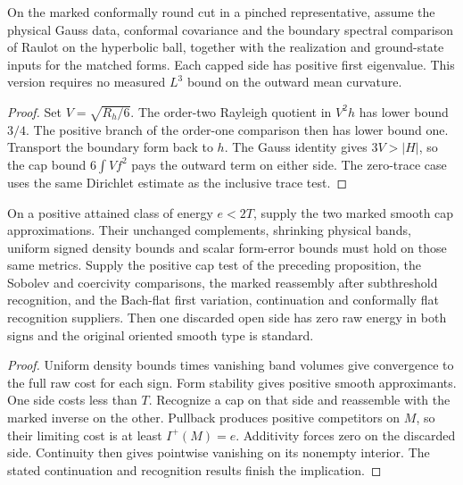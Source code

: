 \begin{proposition}
\label{prop:ed52-weighted-robin}
\leanok
On the marked conformally round cut in a pinched representative, assume
the physical Gauss data, conformal covariance and the boundary spectral
comparison of Raulot on the hyperbolic ball, together with the
realization and ground-state inputs for the matched forms. Each capped
side has positive first eigenvalue. This version requires no measured
$L^3$ bound on the outward mean curvature.
\end{proposition}
\begin{proof}
\leanok
Set $V=\sqrt{R_h/6}$. The order-two Rayleigh quotient in $V^2h$ has
lower bound $3/4$. The positive branch of the order-one comparison
then has lower bound one. Transport the boundary form back to $h$.
The Gauss identity gives $3V>|H|$, so the cap bound
$6\int V f^2$ pays the outward term on either side. The zero-trace
case uses the same Dirichlet estimate as the inclusive trace test.
\end{proof}

\begin{proposition}
\label{prop:ed07-attained-cut}
\leanok
On a positive attained class of energy $e<2T$, supply the two marked
smooth cap approximations. Their unchanged complements, shrinking
physical bands, uniform signed density bounds and scalar form-error
bounds must hold on those same metrics. Supply the positive cap
test of the preceding proposition, the Sobolev and coercivity
comparisons, the marked reassembly after subthreshold recognition,
and the Bach-flat first variation, continuation and conformally flat
recognition suppliers. Then one discarded open side has zero raw
energy in both signs and the original oriented smooth type is standard.
\end{proposition}
\begin{proof}
\leanok
Uniform density bounds times vanishing band volumes give convergence
to the full raw cost for each sign. Form stability gives positive
smooth approximants. One side costs less than $T$. Recognize a cap
on that side and reassemble with the marked inverse on the other.
Pullback produces positive competitors on $M$, so their limiting cost
is at least $I^+(M)=e$. Additivity forces zero on the discarded side.
Continuity then gives pointwise vanishing on its nonempty interior.
The stated continuation and recognition results finish the implication.
\end{proof}

